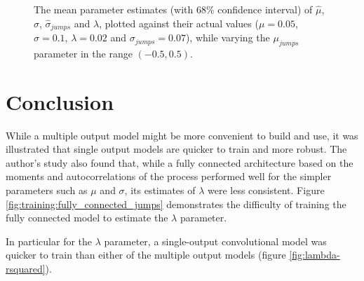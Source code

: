\documentclass[11pt,oneside,openany,a4paper,english, report, goldenblock
]{usthesis}
\begin{document}
\begin{figure}[h]
{\begin{subfloatrow}
	\end{subfloatrow}}{
		\caption{The mean parameter estimates (with $68\%$ confidence interval) of $\hat{\mu}$, $\hat{\sigma}$, $\hat{\sigma}_{jumps}$ and $\lambda$, plotted against their actual values ($\mu = 0.05$, $\sigma = 0.1$, $\lambda= 0.02$ and $\sigma_{jumps} = 0.07$), while varying the $\mu_{jumps}$ parameter in the range $\left(-0.5, 0.5\right)$.}
		\label{fig:sensitivity_test:multiple_output:varying_jumps_mu}}
\end{figure}

\section{Conclusion}
While a multiple output model might be more convenient to build and use, it was illustrated that single output models are quicker to train and more robust. The author's study also found that, while a fully connected architecture based on the moments and autocorrelations of the process performed well for the simpler parameters such as $\mu$ and $\sigma$, its estimates of $\lambda$ were less consistent. Figure \ref{fig:training:fully_connected_jumps} demonstrates the difficulty of training the fully connected model to estimate the $\lambda$ parameter.

In particular for the $\lambda$ parameter, a single-output convolutional model was quicker to train than either of the multiple output models (figure \ref{fig:lambda-rsquared}).
\end{document}
